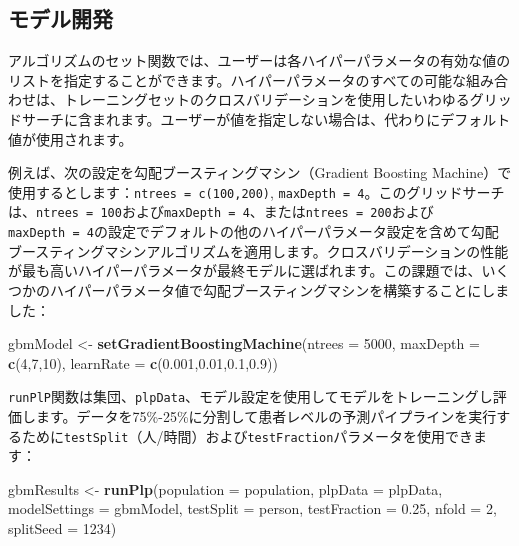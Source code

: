 \documentclass[
  11pt]{book}
\newenvironment{Shaded}{\begin{snugshade}}{\end{snugshade}}
\newcommand{\AttributeTok}[1]{\textcolor[rgb]{0.13,0.29,0.53}{#1}}
\newcommand{\DecValTok}[1]{\textcolor[rgb]{0.00,0.00,0.81}{#1}}
\newcommand{\FloatTok}[1]{\textcolor[rgb]{0.00,0.00,0.81}{#1}}
\newcommand{\FunctionTok}[1]{\textcolor[rgb]{0.13,0.29,0.53}{\textbf{#1}}}
\newcommand{\NormalTok}[1]{#1}
\newcommand{\OtherTok}[1]{\textcolor[rgb]{0.56,0.35,0.01}{#1}}
\newcommand{\StringTok}[1]{\textcolor[rgb]{0.31,0.60,0.02}{#1}}
\theoremstyle{definition}
\theoremstyle{definition}
\theoremstyle{definition}
\theoremstyle{definition}
\theoremstyle{remark}
\begin{document}
\subsection{モデル開発}\label{ux30e2ux30c7ux30ebux958bux767a}

アルゴリズムのセット関数では、ユーザーは各ハイパーパラメータの有効な値のリストを指定することができます。ハイパーパラメータのすべての可能な組み合わせは、トレーニングセットのクロスバリデーションを使用したいわゆるグリッドサーチに含まれます。ユーザーが値を指定しない場合は、代わりにデフォルト値が使用されます。

例えば、次の設定を勾配ブースティングマシン（Gradient Boosting Machine）で使用するとします：\texttt{ntrees\ =\ c(100,200)}, \texttt{maxDepth\ =\ 4}。このグリッドサーチは、\texttt{ntrees\ =\ 100}および\texttt{maxDepth\ =\ 4}、または\texttt{ntrees\ =\ 200}および\texttt{maxDepth\ =\ 4}の設定でデフォルトの他のハイパーパラメータ設定を含めて勾配ブースティングマシンアルゴリズムを適用します。クロスバリデーションの性能が最も高いハイパーパラメータが最終モデルに選ばれます。この課題では、いくつかのハイパーパラメータ値で勾配ブースティングマシンを構築することにしました：

\begin{Shaded}
\begin{Highlighting}[]
\NormalTok{gbmModel }\OtherTok{\textless{}{-}} \FunctionTok{setGradientBoostingMachine}\NormalTok{(}\AttributeTok{ntrees =} \DecValTok{5000}\NormalTok{,}
                                       \AttributeTok{maxDepth =} \FunctionTok{c}\NormalTok{(}\DecValTok{4}\NormalTok{,}\DecValTok{7}\NormalTok{,}\DecValTok{10}\NormalTok{),}
                                       \AttributeTok{learnRate =} \FunctionTok{c}\NormalTok{(}\FloatTok{0.001}\NormalTok{,}\FloatTok{0.01}\NormalTok{,}\FloatTok{0.1}\NormalTok{,}\FloatTok{0.9}\NormalTok{))}
\end{Highlighting}
\end{Shaded}

\texttt{runPlP}関数は集団、\texttt{plpData}、モデル設定を使用してモデルをトレーニングし評価します。データを75\%-25\%に分割して患者レベルの予測パイプラインを実行するために\texttt{testSplit}（人/時間）および\texttt{testFraction}パラメータを使用できます：

\begin{Shaded}
\begin{Highlighting}[]
\NormalTok{gbmResults }\OtherTok{\textless{}{-}} \FunctionTok{runPlp}\NormalTok{(}\AttributeTok{population =}\NormalTok{ population,}
                     \AttributeTok{plpData =}\NormalTok{ plpData,}
                     \AttributeTok{modelSettings =}\NormalTok{ gbmModel,}
                     \AttributeTok{testSplit =} \StringTok{\textquotesingle{}person\textquotesingle{}}\NormalTok{,}
                     \AttributeTok{testFraction =} \FloatTok{0.25}\NormalTok{,}
                     \AttributeTok{nfold =} \DecValTok{2}\NormalTok{,}
                     \AttributeTok{splitSeed =} \DecValTok{1234}\NormalTok{)}
\end{Highlighting}
\end{Shaded}
\end{document}

